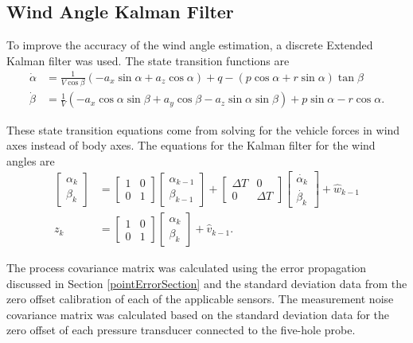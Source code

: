 \subsection*{Wind Angle Kalman Filter}

To improve the accuracy of the wind angle estimation, a discrete Extended Kalman filter was used. The state transition functions are
\begin{align}
\dot{\alpha} & = \frac{1}{V\cos\beta}(-a_x\sin\alpha+a_z\cos\alpha)+q-(p\cos\alpha+r\sin\alpha)\tan\beta\\
\dot{\beta} &=\frac{1}{V}(-a_x\cos\alpha\sin\beta+a_y\cos\beta-a_z\sin\alpha\sin\beta)+p\sin\alpha-r\cos\alpha.
\end{align}

These state transition equations come from solving for the vehicle forces in wind axes instead of body axes\cite{klein2006aircraft}. The equations for the Kalman filter for the wind angles are
\begin{align}
\begin{bmatrix}
\alpha_k\\\beta_k
\end{bmatrix} &= \begin{bmatrix}
1& 0\\0&1
\end{bmatrix}\begin{bmatrix}
\alpha_{k-1}\\\beta_{k-1}
\end{bmatrix}+\begin{bmatrix}
\Delta T& 0\\0&\Delta T
\end{bmatrix}\begin{bmatrix}
\dot{\alpha_{k}}\\\dot{\beta_{k}}
\end{bmatrix}+\hat{w}_{k-1}\\
z_k & = \begin{bmatrix}
1 & 0\\0&1
\end{bmatrix}\begin{bmatrix}
\alpha_{k}\\
\beta_{k}
\end{bmatrix}+\hat{v}_{k-1}.
\end{align}

The process covariance matrix was calculated using the error propagation discussed in Section \ref{pointErrorSection} and the standard deviation data from the zero offset calibration of each of the applicable sensors. The measurement noise covariance matrix was calculated based on the standard deviation data for the zero offset of each pressure transducer connected to the five-hole probe.

